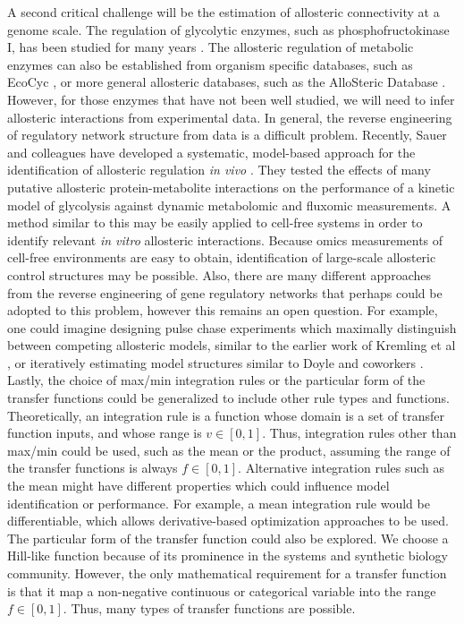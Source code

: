 \documentclass[processes,article,accept,moreauthors,pdftex,12pt,a4paper]{mdpi}
\begin{document}
A second critical challenge will be the estimation of allosteric connectivity at a genome scale. 
The regulation of glycolytic enzymes, such as phosphofructokinase I, has been studied for many years \citep{BERG_BIOCHEMISTRY,Peskov:2008aa}. 
The allosteric regulation of metabolic enzymes can also be established from organism specific databases, such as EcoCyc \citep{Keseler:2013aa}, 
or more general allosteric databases, such as the AlloSteric Database \citep{Huang:2014aa}. 
However, for those enzymes that have not been well studied, we will need to infer allosteric interactions from experimental data.
In general, the reverse engineering of regulatory network structure from data is a difficult problem. 
Recently, Sauer and colleagues have developed a systematic, model-based approach for the identification of allosteric regulation \textit{in vivo} \cite{Link:2013aa}. 
They tested the effects of many putative allosteric protein-metabolite interactions on the performance of a kinetic model of glycolysis against dynamic metabolomic and fluxomic measurements. 
A method similar to this may be easily applied to cell-free systems in order to identify relevant \textit{in vitro} allosteric interactions. 
Because omics measurements of cell-free environments are easy to obtain, identification of large-scale allosteric control structures may be possible. 
Also, there are many different approaches from the reverse engineering of gene regulatory networks that perhaps could be adopted to this problem, however this remains an open question.
For example, one could imagine designing pulse chase experiments which maximally distinguish between competing allosteric models, similar to the earlier work of Kremling et al \citep{Kremling:2004aa}, or
iteratively estimating model structures similar to Doyle and coworkers \citep{Gadkar:2005aa}.
Lastly, the choice of max/min integration rules or the particular form of the transfer functions could be generalized to include other rule types and functions. 
Theoretically, an integration rule is a function whose domain is a set of transfer function inputs, and whose range is $v\in[0,1]$.
Thus, integration rules other than max/min could be used, such as the mean or the product, assuming the range of the transfer functions is always $f\in[0,1]$.
Alternative integration rules such as the mean might have different properties which could influence model identification or performance. 
For example, a mean integration rule would be differentiable, which allows derivative-based optimization approaches to be used. 
The particular form of the transfer function could also be explored. We choose a Hill-like function because of its 
prominence in the systems and synthetic biology community. However, the only mathematical requirement for a transfer function is that it map a non-negative continuous or categorical variable into the range $f\in[0,1]$. Thus, many types of transfer functions are possible.
\end{document}
